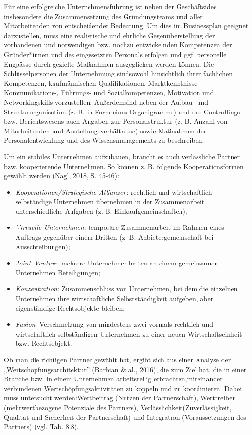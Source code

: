 \documentclass[
  letterpaper,
]{book}
\begin{document}
Für eine erfolgreiche Unternehmensführung ist neben der Geschäftsidee
insbesondere die Zusammensetzung des Gründungsteams und aller
Mitarbeitenden von entscheidender Bedeutung. Um dies im Businessplan
geeignet darzustellen, muss eine realistische und ehrliche
Gegenüberstellung der vorhandenen und notwendigen bzw. nochzu
entwickelnden Kompetenzen der Gründer*innen und des eingesetzten
Personals erfolgen und ggf. personelle Engpässe durch gezielte Maßnahmen
ausgeglichen werden können. Die Schlüsselpersonen der Unternehmung
sindsowohl hinsichtlich ihrer fachlichen Kompetenzen, kaufmännischen
Qualifikationen, Marktkenntnisse, Kommunikations-, Führungs- und
Sozialkompetenzen, Motivation und Networkingskills vorzustellen.
Außerdemsind neben der Aufbau- und Strukturorganisation (z. B. in Form
eines Organigramms) und des Controllings- bzw. Berichtswesens auch
Angaben zur Personalstruktur (z. B. Anzahl von Mitarbeitenden und
Anstellungsverhältnisse) sowie Maßnahmen der Personalentwicklung und des
Wissensmanagements zu beschreiben.

Um ein stabiles Unternehmen aufzubauen, braucht es auch verlässliche
Partner bzw. kooperierende Unternehmen. So können z. B. folgende
Kooperationsformen gewählt werden (Nagl, 2018, S. 45-46):

\begin{itemize}
\item
  \emph{Kooperationen/Strategische Allianzen}: rechtlich und
  wirtschaftlich selbständige Unternehmen übernehmen in der
  Zusammenarbeit unterschiedliche Aufgaben (z. B.
  Einkaufgemeinschaften);
\item
  \emph{Virtuelle Unternehmen}: temporäre Zusammenarbeit im Rahmen eines
  Auftrags gegenüber einem Dritten (z. B. Anbietergemeinschaft bei
  Ausschreibungen);
\item
  \emph{Joint}--\emph{Venture}: mehrere Unternehmer halten an einem
  gemeinsamen Unternehmen Beteiligungen;
\item
  \emph{Konzentration}: Zusammenschluss von Unternehmen, bei dem die
  einzelnen Unternehmen ihre wirtschaftliche Selbstständigkeit aufgeben,
  aber eigenständige Rechtsobjekte bleiben;
\item
  \emph{Fusion}: Verschmelzung von mindestens zwei vormals rechtlich und
  wirtschaftlich selbständigen Unternehmen zu einer neuen
  Wirtschaftseinheit bzw. Rechtsobjekt.
\end{itemize}

Ob man die richtigen Partner gewählt hat, ergibt sich aus einer Analyse
der „Wertschöpfungsarchitektur'' (Barbian \& al., 2016), die zum Ziel
hat, die in einer Branche bzw. in einem Unternehmen arbeitsteilig
erbrachten,miteinander verbundenen Wertschöpfungsaktivitäten zu koppeln
und zu koordinieren. Dabei muss untersucht werden:Wertbeitrag (Nutzen
der Partnerschaft), Werttreiber (mehrwertbezogene Potenziale des
Partners), Verlässlichkeit(Zuverlässigkeit, Qualität und Sicherheit der
Partnerschaft) und Integration (Voraussetzungen des Partners) (vgl.
\hyperref[table88]{Tab. 8.8}).
\end{document}
